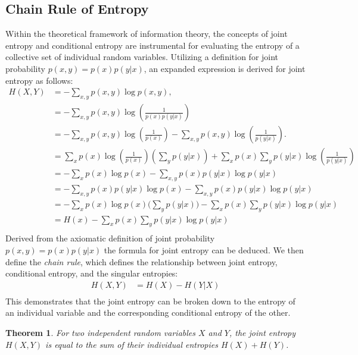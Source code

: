 \documentclass[12pt]{article}
\newtheorem{theorem}{Theorem}
\begin{document}
		
		\subsection{Chain Rule of Entropy}
		Within the theoretical framework of information theory, the concepts of joint entropy and conditional entropy are instrumental for evaluating the entropy of a collective set of individual random variables. Utilizing a  definition for joint probability \( p(x, y) = p(x) p(y | x) \), an expanded expression is derived for joint entropy as follows:
		\begin{align}
			H(X, Y) & = -\sum_{x, y} p(x, y) \log p(x, y), \\
			&= -\sum_{x, y} p(x, y) \log \left(\frac{1}{p(x)p(y|x)}\right) \\
			&= -\sum_{x, y} p(x, y) \log \left(\frac{1}{p(x)}\right) - \sum_{x, y} p(x, y) \log \left(\frac{1}{p(y|x)}\right).\\
			&= \sum_{x} p(x) \log \left(\frac{1}{p(x)}\right) \left(\sum_{y} p(y|x)\right) + \sum_{x} p(x) \sum_{y} p(y|x) \log \left(\frac{1}{p(y|x)}\right) \\
			& = -\sum_{x} p(x) \log p(x) - \sum_{x,y} p(x) p(y|x) \log p(y|x) \\
			& = -\sum_{x,y} p(x) p(y|x) \log p(x) - \sum_{x,y} p(x) p(y|x) \log p(y|x) \\
			& = -\sum_{x} p(x)  \log p(x) \Biggr( \sum_{y}  p(y|x)  \Biggr) - \sum_{x} p(x)  \sum_{y}  p(y|x)   \log p(y|x) \\
			& =H(x) - \sum_{x} p(x)  \sum_{y}  p(y|x)   \log p(y|x) \\
		\end{align}
		Derived from the axiomatic definition of joint probability \( p(x, y) = p(x) p(y | x) \) the formula for joint entropy can be deduced. We then define the \emph{chain rule}, which defines the relationship between joint entropy, conditional entropy, and the singular entropies:
		\begin{equation}
			\begin{split}
				H(X, Y) 
				& =  H(X) - H(Y|X) \\
			\end{split}
		\end{equation}
		This demonstrates that the joint entropy can be broken down to the entropy of an individual variable and the corresponding conditional entropy of the other.
		\begin{theorem}
			For two independent random variables \(X\) and \(Y\), the joint entropy \(H(X, Y)\) is equal to the sum of their individual entropies \(H(X) + H(Y)\).
		\end{theorem}
\end{document}
